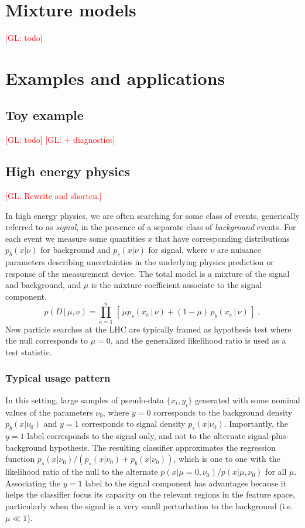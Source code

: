 \documentclass[12pt]{article}
\numberwithin{equation}{section}
\theoremstyle{plain}
\newcommand{\glnote}[1]{\textcolor{red}{[GL: #1]}}
\begin{document}
\section{Mixture models}

\glnote{todo}

\section{Examples and applications}

\subsection{Toy example}

\glnote{todo}
\glnote{+ diagnostics}

\subsection{High energy physics}

\glnote{Rewrite and shorten.}

In high energy physics, we are often searching for some class of events,
generically referred to as \textit{signal}, in the presence of a separate class
of \textit{background} events.  For each event we measure some quantities $x$
that have corresponding distributions $p_b(x|\nu)$ for background and
$p_s(x|\nu)$ for signal, where $\nu$ are nuisance parameters describing
uncertainties in the underlying physics prediction or response of the
measurement device. The total model is a mixture of the signal and background,
and $\mu$ is the mixture coefficient associate to the signal component.
\begin{equation}\label{eq:hepGen}
p( D \,|\, \mu, \nu) = \prod_{e=1}^n \, \left[\, \mu p_s( x_e \, |\,  \nu)  + (1-\mu)\, p_b( x_e \,|\, \nu) \,\right] \; ,
\end{equation}
New particle searches at the LHC are typically framed as hypothesis test where
the null corresponds to $\mu=0$, and the generalized likelihood ratio is used as a test
statistic.

\subsubsection{Typical usage pattern}

In this setting, large samples of pseudo-data $\{x_i, y_i\}$ generated with some
nominal values of the parameters $\nu_0$, where $y=0$ corresponds to the
background density $p_b(x|\nu_0)$  and $y=1$ corresponds to signal density
$p_s(x|\nu_0)$. Importantly, the $y=1$ label corresponds to the signal only, and
not to the alternate signal-plus-background hypothesis. The resulting classifier
approximates the regression function $p_s(x|\nu_0)/(p_s(x|\nu_0)+p_b(x|\nu_0))$,
which is one to one with the likelihood ratio of the null to the alternate
$p(x|\mu=0,\nu_0)/p(x|\mu,\nu_0)$ for all $\mu$. Associating the $y=1$ label to
the signal component has advantages because it helps the classifier focus its
capacity on the relevant regions in the feature space, particularly when the
signal is a very small perturbation to the background (i.e. $\mu \ll 1$).
\end{document}
